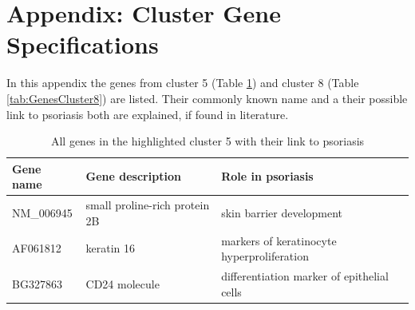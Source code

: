 \documentclass[10pt,a4paper]{report}
\begin{document}
	\section{Appendix: Cluster Gene Specifications}
	\label{app:ClusterGeneSpecifications}
	
	In this appendix the genes from cluster 5 (Table \ref{tab:GenesCluster5}) and cluster 8 (Table \ref{tab:GenesCluster8}) are listed. Their commonly known name and a their possible link to psoriasis both are explained, if found in literature.
	
	\begin{table}[]
		\centering
		\caption{All genes in the highlighted cluster 5 with their link to psoriasis}
		\label{tab:GenesCluster5}
		\begin{tabular}{l|p{4.5cm} p{8.5cm}}
			\textbf{Gene name} & \textbf{Gene description}                                                                                               & \textbf{Role in psoriasis}                                                                                                                                                                                                                \\ \hline
			NM\_006945         & small proline-rich protein 2B                                                                                           & skin barrier development\cite{roberson2010psoriasis}                                                                                                                                                                                                                  \\
			AF061812           & keratin 16                                                                                                              & markers of keratinocyte hyperproliferation\cite{leigh1995keratins}                                                                                                                                                                                                \\
			BG327863           & CD24 molecule                                                                                                           & differentiation marker of epithelial cells\cite{vegfors2012expression}                                                                                                                                                                                                \\

\end{tabular}
\end{table}
\end{document}
